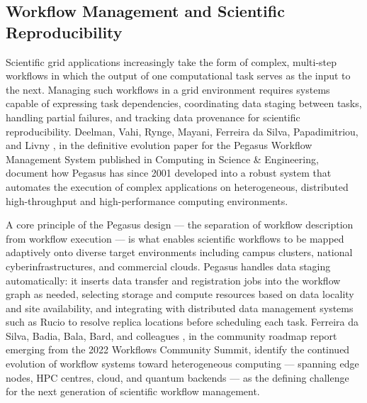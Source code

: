 \documentclass[12pt,a4paper]{report}
\begin{document}
\subsection*{Workflow Management and Scientific Reproducibility}
Scientific grid applications increasingly take the form of complex, multi-step workflows in which the output of one computational task serves as the 
input to the next. Managing such workflows in a grid environment requires systems capable of expressing task dependencies, coordinating data staging 
between tasks, handling partial failures, and tracking data provenance for scientific reproducibility. Deelman, Vahi, Rynge, Mayani, Ferreira da Silva, 
Papadimitriou, and Livny \parencite{deelman2019pegasus}, in the definitive evolution paper for the Pegasus Workflow Management System published in Computing in Science & 
Engineering, document how Pegasus has since 2001 developed into a robust system that automates the execution of complex applications on heterogeneous, 
distributed high-throughput and high-performance computing environments. 

A core principle of the Pegasus design — the separation of workflow description 
from workflow execution — is what enables scientific workflows to be mapped adaptively onto diverse target environments including campus clusters, 
national cyberinfrastructures, and commercial clouds. Pegasus handles data staging automatically: it inserts data transfer and registration jobs into 
the workflow graph as needed, selecting storage and compute resources based on data locality and site availability, and integrating with distributed 
data management systems such as Rucio to resolve replica locations before scheduling each task. Ferreira da Silva, Badia, Bala, Bard, and colleagues \parencite{ferreiradasilva2023roadmap},
 in the community roadmap report emerging from the 2022 Workflows Community Summit, identify the continued evolution of workflow systems toward heterogeneous
  computing — spanning edge nodes, HPC centres, cloud, and quantum backends — as the defining challenge for the next generation of scientific workflow 
  management.
\end{document}
